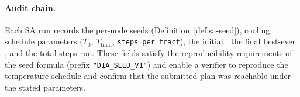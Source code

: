 \paragraph{Audit chain.}
Each SA run records the per-node seeds (Definition~\ref{def:sa-seed}),
cooling schedule parameters ($T_0$, $T_{\mathrm{final}}$,
\texttt{steps\_per\_tract}), the initial \metis{} \ec{}, the final
best-ever \ec{}, and the total steps run.
These fields satisfy the reproducibility requirements of the \dia{} seed
formula (prefix \texttt{"DIA\_SEED\_V1"}) and enable a verifier to
reproduce the temperature schedule and confirm that the submitted plan was
reachable under the stated parameters.
